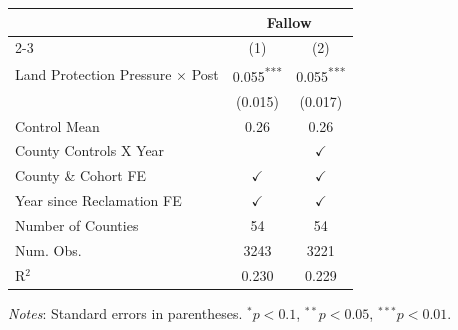 
\begin{tabular}{lcc}
\toprule
& \multicolumn{2}{c}{Fallow} \\
\cmidrule(lr){2-3}
& (1) & (2) \\
\midrule

Land Protection Pressure × Post 
    & 0.055\textsuperscript{***} 
    & 0.055\textsuperscript{***} \\
& (0.015) & (0.017) \\[2pt]

Control Mean & 0.26 & 0.26 \\

County Controls X Year
    &  
    & $\checkmark$ \\

County \& Cohort FE 
    & $\checkmark$ 
    & $\checkmark$ \\

Year since Reclamation FE
    & $\checkmark$
    & $\checkmark$ \\

Number of Counties
    & 54 & 54 \\

Num. Obs.
    & 3243 & 3221 \\

R$^{2}$
    & 0.230 & 0.229 \\
\bottomrule
\end{tabular}

{\footnotesize
\textit{Notes}: Standard errors in parentheses.
$^{*} p<0.1$, $^{**} p<0.05$, $^{***} p<0.01$.
\par}
